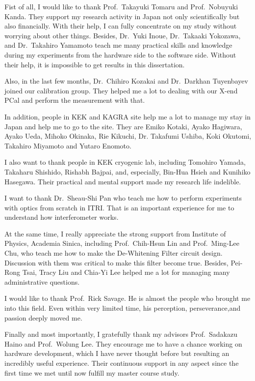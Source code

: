 Fist of all, I would like to thank Prof.~Takayuki Tomaru and Prof.~Nobuyuki Kanda. They support my research activity in Japan not only scientifically but also financially. With their help, I can fully concentrate on my study without worrying about other things. Besides, Dr.~Yuki Inoue, Dr.~Takaaki Yokozawa, and Dr.~Takahiro Yamamoto teach me many practical skills and knowledge during my experiments from the hardware side to the software side. Without their help, it is impossible to get results in this dissertation.

Also, in the last few months, Dr.~Chihiro Kozakai and Dr.~Darkhan Tuyenbayev joined our calibration group. They helped me a lot to dealing with our X-end PCal and perform the measurement with that.

In addition, people in KEK and KAGRA site help me a lot to manage my stay in Japan and help me to go to the site. They are Emiko Kotaki, Ayako Hagiwara, Ayako Ueda, Mihoko Okinaka, Rie Kikuchi, Dr. Takafumi Ushiba, Koki Okutomi, Takahiro Miyamoto and Yutaro Enomoto.

I also want to thank people in KEK cryogenic lab, including Tomohiro Yamada, Takaharu Shishido, Rishabh Bajpai, and, especially, Bin-Hua Hsieh and Kunihiko Hasegawa. Their practical and mental support made my research life indelible.

I want to thank Dr.~Sheau-Shi Pan who teach me how to perform experiments with optics from scratch in ITRI. That is an important experience for me to understand how interferometer works.

At the same time, I really appreciate the strong support from Institute of Physics, Academia Sinica, including Prof.~Chih-Hsun Lin and Prof.~Ming-Lee Chu, who teach me how to make the De-Whitening Filter circuit design. Discussion with them was critical to make this filter become true. Besides, Pei-Rong Tsai, Tracy Liu and Chia-Yi Lee helped me a lot for managing many administrative questions.

I would like to thank Prof.~Rick Savage. He is almost the people who brought me into this field. Even within very limited time, his perception, perseverance,and passion deeply moved me.

Finally and most importantly, I gratefully thank my advisors Prof.~Sadakazu Haino and Prof.~Wolung Lee. They encourage me to have a chance working on hardware development, which I have never thought before but resulting an incredibly useful experience. Their continuous support in any aspect since the first time we met until now fulfill my master course study.

